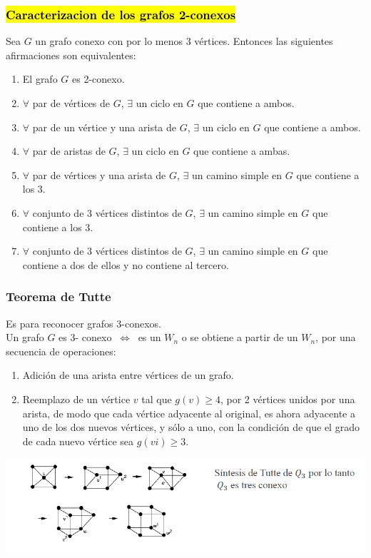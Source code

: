 \documentclass{article}
\newcommand{\Leftrightarrows}{\: \Leftrightarrow \:}    %
\begin{document}
\subsubsection*{\hl{Caracterizacion de los grafos 2-conexos}}
Sea $G$ un grafo conexo con por lo menos 3 vértices. Entonces las siguientes afirmaciones son equivalentes:
\begin{enumerate}
    \item El grafo $G$ es 2-conexo.
    \item $\forall$ par de vértices de $G$, $\exists$ un ciclo en $G$ que contiene a ambos.
    \item $\forall$ par de un vértice y una arista de $G$, $\exists$ un ciclo en $G$ que contiene a ambos.
    \item $\forall$ par de aristas de $G$, $\exists$ un ciclo en $G$ que contiene a ambas.
    \item $\forall$ par de vértices y una arista de $G$, $\exists$ un camino simple en $G$ que contiene a los 3.
    \item $\forall$ conjunto de 3 vértices distintos de $G$, $\exists$ un camino simple en $G$ que contiene a los 3.
    \item $\forall$ conjunto de 3 vértices distintos de $G$, $\exists$ un camino simple en $G$ que contiene a dos de ellos y no contiene al tercero.
\end{enumerate}

\subsubsection{Teorema de Tutte}
Es para reconocer grafos 3-conexos.
\\Un grafo $G$ es 3- conexo $\Leftrightarrows$ es un $W_n$ o se obtiene a partir de un $W_n$, por una secuencia de operaciones:
\begin{enumerate}
    \item Adición de una arista entre vértices de un grafo.
    \item Reemplazo de un vértice $v$ tal que $g(v) \geq 4$, por 2 vértices unidos por una arista, de modo que cada vértice adyacente al original, es ahora adyacente a
uno de los dos nuevos vértices, y sólo a uno, con la condición de que el grado
de cada nuevo vértice sea $g(vi) \geq 3$.
\end{enumerate}
\begin{center}
    \includegraphics[width=\textwidth]{sintesisTutte.PNG}
\end{center}
\end{document}
